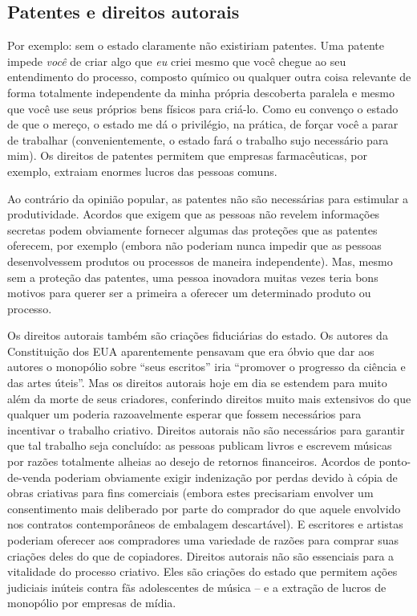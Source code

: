 \subsection*{Patentes e direitos autorais}

Por exemplo: sem o estado claramente não existiriam patentes. Uma patente impede \emph{você} de criar algo que \emph{eu} criei mesmo que você chegue ao seu entendimento do processo, composto químico ou qualquer outra coisa relevante de forma totalmente independente da minha própria descoberta paralela e mesmo que você use seus próprios bens físicos para criá-lo. Como eu convenço o estado de que o mereço, o estado me dá o privilégio, na prática, de forçar você a parar de trabalhar (convenientemente, o estado fará o trabalho sujo necessário para mim). Os direitos de patentes permitem que empresas farmacêuticas, por exemplo, extraiam enormes lucros das pessoas comuns.

Ao contrário da opinião popular, as patentes não são necessárias para estimular a produtividade. Acordos que exigem que as pessoas não revelem informações secretas podem obviamente fornecer algumas das proteções que as patentes oferecem, por exemplo (embora não poderiam nunca impedir que as pessoas desenvolvessem produtos ou processos de maneira independente). Mas, mesmo sem a proteção das patentes, uma pessoa inovadora muitas vezes teria bons motivos para querer ser a primeira a oferecer um determinado produto ou processo.

Os direitos autorais também são criações fiduciárias do estado. Os autores da Constituição dos EUA aparentemente pensavam que era óbvio que dar aos autores o monopólio sobre ``seus escritos'' iria ``promover o progresso da ciência e das artes úteis''. Mas os direitos autorais hoje em dia se estendem para muito além da morte de seus criadores, conferindo direitos muito mais extensivos do que qualquer um poderia razoavelmente esperar que fossem necessários para incentivar o trabalho criativo. Direitos autorais não são necessários para garantir que tal trabalho seja concluído: as pessoas publicam livros e escrevem músicas por razões totalmente alheias ao desejo de retornos financeiros. Acordos de ponto-de-venda poderiam obviamente exigir indenização por perdas devido à cópia de obras criativas para fins comerciais (embora estes precisariam envolver um consentimento mais deliberado por parte do comprador do que aquele envolvido nos contratos contemporâneos de embalagem descartável). E escritores e artistas poderiam oferecer aos compradores uma variedade de razões para comprar suas criações deles do que de copiadores. Direitos autorais não são essenciais para a vitalidade do processo criativo. Eles são criações do estado que permitem ações judiciais inúteis contra fãs adolescentes de música -- e a extração de lucros de monopólio por empresas de mídia.

